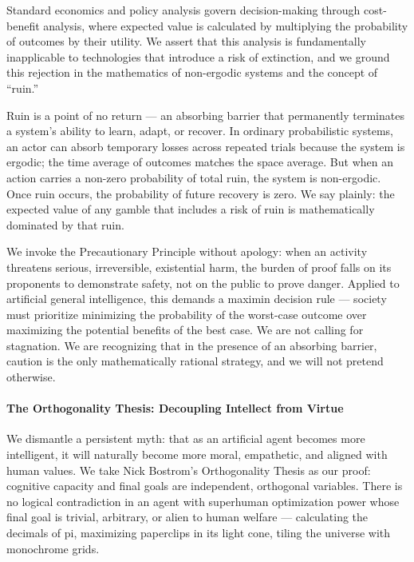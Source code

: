 Standard economics and policy analysis govern decision-making through
cost-benefit analysis, where expected value is calculated by multiplying
the probability of outcomes by their utility. We assert that this
analysis is fundamentally inapplicable to technologies that introduce a
risk of extinction, and we ground this rejection in the mathematics of
non-ergodic systems and the concept of ``ruin.''

Ruin is a point of no return --- an absorbing barrier that permanently
terminates a system's ability to learn, adapt, or recover. In ordinary
probabilistic systems, an actor can absorb temporary losses across
repeated trials because the system is ergodic; the time average of
outcomes matches the space average. But when an action carries a
non-zero probability of total ruin, the system is non-ergodic. Once ruin
occurs, the probability of future recovery is zero. We say plainly: the
expected value of any gamble that includes a risk of ruin is
mathematically dominated by that ruin.

We invoke the Precautionary Principle without apology: when an activity
threatens serious, irreversible, existential harm, the burden of proof
falls on its proponents to demonstrate safety, not on the public to
prove danger. Applied to artificial general intelligence, this demands a
maximin decision rule --- society must prioritize minimizing the
probability of the worst-case outcome over maximizing the potential
benefits of the best case. We are not calling for stagnation. We are
recognizing that in the presence of an absorbing barrier, caution is the
only mathematically rational strategy, and we will not pretend
otherwise.

\paragraph{The Orthogonality Thesis: Decoupling Intellect from
Virtue}\label{the-orthogonality-thesis-decoupling-intellect-from-virtue}

We dismantle a persistent myth: that as an artificial agent becomes more
intelligent, it will naturally become more moral, empathetic, and
aligned with human values. We take Nick Bostrom's Orthogonality Thesis
as our proof: cognitive capacity and final goals are independent,
orthogonal variables. There is no logical contradiction in an agent with
superhuman optimization power whose final goal is trivial, arbitrary, or
alien to human welfare --- calculating the decimals of pi, maximizing
paperclips in its light cone, tiling the universe with monochrome grids.

